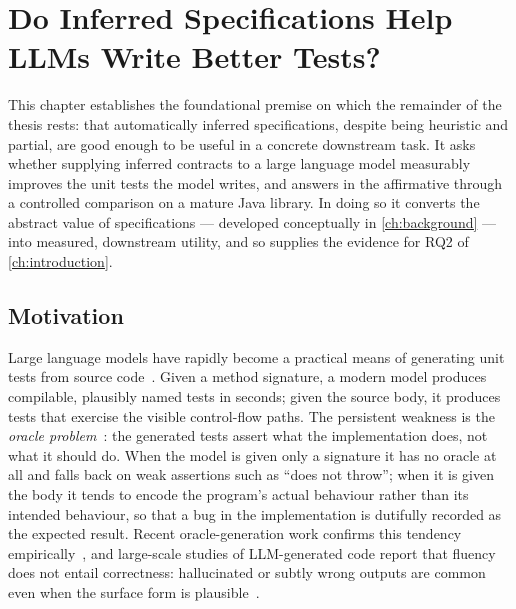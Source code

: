 \chapter{Do Inferred Specifications Help LLMs Write Better Tests?}\label{ch:article1}

This chapter establishes the foundational premise on which the remainder of the
thesis rests: that automatically inferred specifications, despite being heuristic
and partial, are good enough to be useful in a concrete downstream task. It asks
whether supplying inferred contracts to a large language model measurably improves
the unit tests the model writes, and answers in the affirmative through a
controlled comparison on a mature Java library. In doing so it converts the
abstract value of specifications --- developed conceptually in \cref{ch:background}
--- into measured, downstream utility, and so supplies the evidence for RQ2 of
\cref{ch:introduction}.

\section{Motivation}
\label{sec:art1:motivation}

Large language models have rapidly become a practical means of generating unit
tests from source code~\citep{chen2021codex,tufano2020athenatest,yuan2024chattester,schafer2024testpilot}.
Given a method signature, a modern model produces compilable, plausibly named
tests in seconds; given the source body, it produces tests that exercise the
visible control-flow paths. The persistent weakness is the \emph{oracle problem}~\citep{barr2015oracle}:
the generated tests assert what the implementation does, not what it should do.
When the model is given only a signature it has no oracle at all and falls back on
weak assertions such as \enquote{does not throw}; when it is given the body it
tends to encode the program's actual behaviour rather than its intended
behaviour, so that a bug in the implementation is dutifully recorded as the
expected result. Recent oracle-generation work confirms this tendency
empirically~\citep{liu2026oracle,watson2020atlas}, and large-scale studies of
LLM-generated code report that fluency does not entail correctness: hallucinated
or subtly wrong outputs are common even when the surface form is
plausible~\citep{zhang2025hallucination,liu2023evalplus}.

